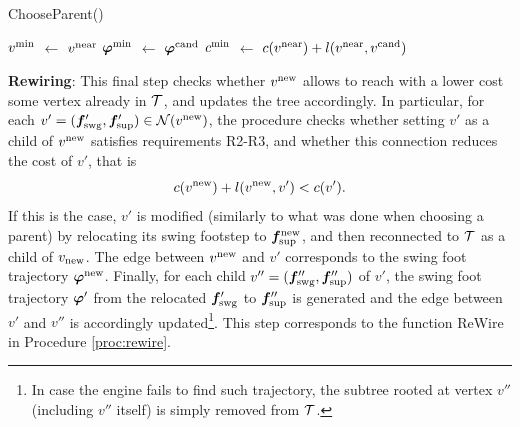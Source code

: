 \begin{procedure}%
	\small
	\removelatexerror
	
	\caption{ChooseParent()}
	\label{proc:chooseparent}

	\vspace{2pt}
    \BlankLine
	
	$v^{\rm min}$ $\leftarrow$ $v^{\rm near}$\;
	${\bm{\varphi}}^{\rm min}$ $\leftarrow$ ${\bm{\varphi}}^{\rm cand}$\;
	$c^{\rm min}$ $\leftarrow$ $c(v^{\rm near}) + l(v^{\rm near}, v^{\rm cand})$\;
	
	\;	
\end{procedure}

{\bf Rewiring}: This final step checks whether $v^{\rm new}$ allows to reach
with a lower cost some vertex already in $\cal T$, and updates the tree
accordingly. In particular, for each
$v' = ({\bm{f}}'_{\rm swg}, {\bm{f}}'_{\rm sup}) \in {\cal N} (v^{\rm new})$,
the procedure checks whether setting $v'$ as a child of $v^{\rm new}$ satisfies
requirements R2-R3, and whether this connection reduces the cost of $v'$,
that is 
\[
c(v^{\rm new}) + l(v^{\rm new}, v') < c(v').
\]
If this is the case, $v'$ is modified (similarly to what was done when choosing
a parent) by relocating its swing footstep to ${\bm{f}}_{\rm sup}^{\rm new}$, and
then  reconnected to $\cal T$ as a child of $v_{\rm new}$. The edge between
$v^{\rm new}$ and $v'$ corresponds to the swing foot trajectory
${\bm{\varphi}}^{\rm new}$. Finally, for each child
$v'' = ({\bm{f}}''_{\rm swg}, {\bm{f}}''_{\rm sup})$ of $v'$, the swing foot trajectory
${\bm{\varphi}}'$ from the relocated ${\bm{f}}'_{\rm swg}$ to ${\bm{f}}''_{\rm sup}$ is
generated and the edge between $v'$ and $v''$ is accordingly
updated\footnote{In case the engine fails to find such trajectory, the subtree
rooted at vertex $v''$ (including $v''$ itself) is simply removed from $\cal T$.}.
This step corresponds to the function ReWire in Procedure \ref{proc:rewire}.

